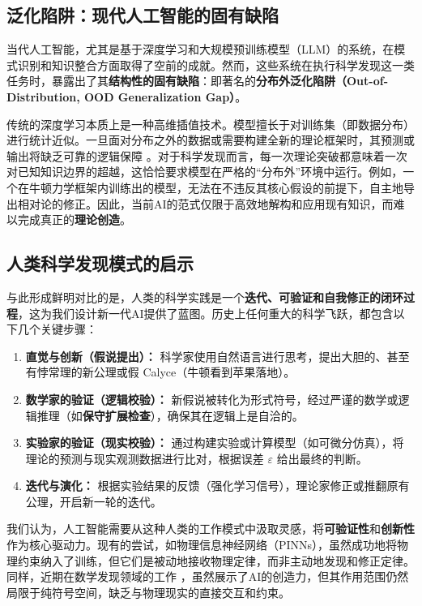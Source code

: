 \documentclass[11pt, a4paper]{article}
\begin{document}
\subsection{泛化陷阱：现代人工智能的固有缺陷}

当代人工智能，尤其是基于深度学习和大规模预训练模型（LLM）的系统，在模式识别和知识整合方面取得了空前的成就。然而，这些系统在执行科学发现这一类任务时，暴露出了其\textbf{结构性的固有缺陷}：即著名的\textbf{分布外泛化陷阱（Out-of-Distribution, OOD Generalization Gap）}。

传统的深度学习本质上是一种高维插值技术。模型擅长于对训练集（即数据分布）进行统计近似。一旦面对分布之外的数据或需要构建全新的理论框架时，其预测或输出将缺乏可靠的逻辑保障 \citep{garcez2019neural}。对于科学发现而言，每一次理论突破都意味着一次对已知知识边界的超越，这恰恰要求模型在严格的“分布外”环境中运行。例如，一个在牛顿力学框架内训练出的模型，无法在不违反其核心假设的前提下，自主地导出相对论的修正。因此，当前AI的范式仅限于高效地解构和应用现有知识，而难以完成真正的\textbf{理论创造}。

\subsection{人类科学发现模式的启示}

与此形成鲜明对比的是，人类的科学实践是一个\textbf{迭代、可验证和自我修正的闭环过程}，这为我们设计新一代AI提供了蓝图。历史上任何重大的科学飞跃，都包含以下几个关键步骤：

\begin{enumerate}
	\item \textbf{直觉与创新（假说提出）：} 科学家使用自然语言进行思考，提出大胆的、甚至有悖常理的新公理或假 Calyce（牛顿看到苹果落地）。
	\item \textbf{数学家的验证（逻辑校验）：} 新假说被转化为形式符号，经过严谨的数学或逻辑推理（如\textbf{保守扩展检查}），确保其在逻辑上是自洽的。
	\item \textbf{实验家的验证（现实校验）：} 通过构建实验或计算模型（如可微分仿真），将理论的预测与现实观测数据进行比对，根据误差 $\varepsilon$ 给出最终的判断。
	\item \textbf{迭代与演化：} 根据实验结果的反馈（强化学习信号），理论家修正或推翻原有公理，开启新一轮的迭代。
\end{enumerate}

我们认为，人工智能需要从这种人类的工作模式中汲取灵感，将\textbf{可验证性}和\textbf{创新性}作为核心驱动力。现有的尝试，如物理信息神经网络（PINNs）\citep{raissi2019pinns}，虽然成功地将物理约束纳入了训练，但它们是被动地接收物理定律，而非主动地发现和修正定律。同样，近期在数学发现领域的工作 \citep{fawzi2022discovering}，虽然展示了AI的创造力，但其作用范围仍然局限于纯符号空间，缺乏与物理现实的直接交互和约束。
\end{document}
